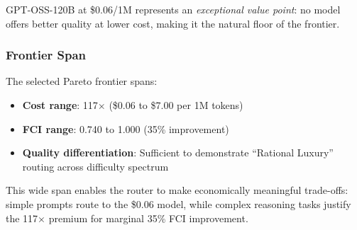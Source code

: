 GPT-OSS-120B at \$0.06/1M represents an \textit{exceptional value point}: no model offers better quality at lower cost, making it the natural floor of the frontier.

\subsubsection{Frontier Span}

The selected Pareto frontier spans:
\begin{itemize}
\item \textbf{Cost range}: 117$\times$ (\$0.06 to \$7.00 per 1M tokens)
\item \textbf{FCI range}: 0.740 to 1.000 (35\% improvement)
\item \textbf{Quality differentiation}: Sufficient to demonstrate ``Rational Luxury'' routing across difficulty spectrum
\end{itemize}

This wide span enables the router to make economically meaningful trade-offs: simple prompts route to the \$0.06 model, while complex reasoning tasks justify the 117$\times$ premium for marginal 35\% FCI improvement.


